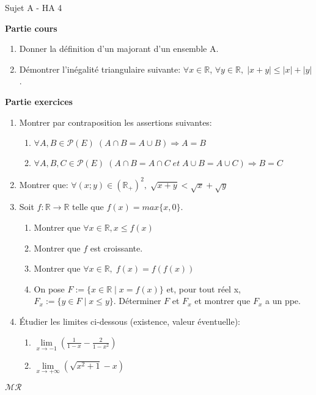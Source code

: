 \documentclass[a4paper,11pt, landscape]{article}
\begin{document}
\begin{multicols*}{4}
\setlength{\columnsep}{1cm}
\centerline{Sujet A - HA 4}
\begin{flushleft}
  \textbf{Partie cours} 
\end{flushleft} 

\begin{enumerate}[leftmargin=*]
  \item Donner la définition d'un majorant d'un ensemble A. 
  \item Démontrer l'inégalité triangulaire suivante: $\forall x \in \mathbb{R}$, $\forall y \in \mathbb{R}, \; |x + y | \leq |x| + |y|$.
\end{enumerate}
\textbf{Partie exercices}
\begin{enumerate}[leftmargin=*]
  \item Montrer par contraposition les assertions suivantes:
  \begin{enumerate}
    \item $\forall A, B \in \mathcal{P}(E) \; (A \cap B = A \cup B) \Rightarrow A = B$
    \item $\forall A, B, C \in \mathcal{P}(E) \; (A \cap B = A \cap C \; et \; A \cup B  = A \cup C) \Rightarrow B = C$
  \end{enumerate}
  \item Montrer que: $\forall (x;y) \in (\mathbb{R}_+)^2, \; \sqrt{x+y} < \sqrt{x} + \sqrt{y}$
  \item Soit $f : \mathbb{R} \rightarrow \mathbb{R}$ telle que $f(x) = max\{x, 0\}$.
  \begin{enumerate}
    \item Montrer que $\forall x \in \mathbb{R}, x \leq f(x)$
    \item Montrer que $f$ est croissante.
    \item Montrer que $\forall x \in \mathbb{R}, \; f(x) = f(f(x))$
    \item On pose $F:= \{x \in \mathbb{R} \; | \; x = f(x)\}$ et, pour tout réel x, $F_x := \{y \in F \; | \; x \leq y\}$. Déterminer $F$ et $F_x$ et montrer que $F_x$ a un ppe.
  \end{enumerate}
  \item Étudier les limites ci-dessous (existence, valeur éventuelle):
  \begin{enumerate}
    \item $\lim\limits_{x \rightarrow -1}\left(\frac{1}{1-x} - \frac{2}{1-x^2}\right)$
    \item $\lim\limits_{x \rightarrow +\infty }\left(\sqrt{x^2+1} - x\right)$
  \end{enumerate}
\end{enumerate}
\centerline{$\mathcal{MR}$}


\end{multicols*}
\end{document}
